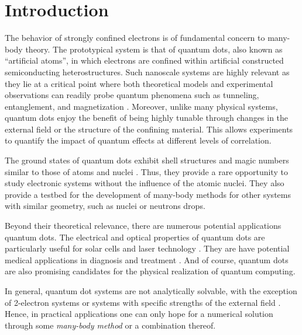 \maketitle

\section{Introduction}

The behavior of strongly confined electrons is of fundamental concern to many-body theory.  The prototypical system is that of quantum dots, also known as ``artificial atoms'', in which electrons are confined within artificial constructed semiconducting heterostructures.  Such nanoscale systems are highly relevant as they lie at a critical point where both theoretical models and experimental observations can readily probe quantum phenomena such as tunneling, entanglement, and magnetization \cite{reimann2002,engel1993}.  Moreover, unlike many physical systems, quantum dots enjoy the benefit of being highly tunable through changes in the external field or the structure of the confining material.  This allows experiments to quantify the impact of quantum effects at different levels of correlation.

The ground states of quantum dots exhibit shell structures and magic numbers similar to those of atoms and nuclei \cite{tarucha1996}.  Thus, they provide a rare opportunity to study electronic systems without the influence of the atomic nuclei.  They also provide a testbed for the development of many-body methods for other systems with similar geometry, such as nuclei or neutrons drops.

Beyond their theoretical relevance, there are numerous potential applications quantum dots.  The electrical and optical properties of quantum dots are particularly useful for solar cells \cite{jenks:013111,doi:10.1021/cr900289f} and laser technology \cite{strauf2010,5075760}.  They are have potential medical applications in diagnosis and treatment \cite{Ben-Ari02042003}.  And of course, quantum dots are also promising candidates for the physical realization of quantum computing\cite{PhysRevA.57.120}.

In general, quantum dot systems are not analytically solvable, with the exception of 2-electron systems or systems with specific strengths of the external field \cite{PhysRevA.48.3561}.  Hence, in practical applications one can only hope for a numerical solution through some \textit{many-body method} or a combination thereof.

